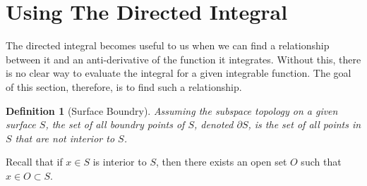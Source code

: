\documentclass[12pt]{article}
\numberwithin{equation}{section}
\newtheorem{definition}{Definition}[section]
\begin{document}

\section{Using The Directed Integral}

The directed integral becomes useful to us when we can find a relationship between it
and an anti-derivative of the function it integrates.  Without this, there is no clear way
to evaluate the integral for a given integrable function.  The goal of this section, therefore,
is to find such a relationship.

\begin{definition}[Surface Boundry]
Assuming the subspace topology on a given surface $S$, the set of
all boundry points of $S$, denoted $\partial S$, is the set of all points
in $S$ that are not interior to $S$.
\end{definition}

Recall that if $x\in S$ is interior to $S$, then there exists an open
set $O$ such that $x\in O\subset S$.

\end{document}
